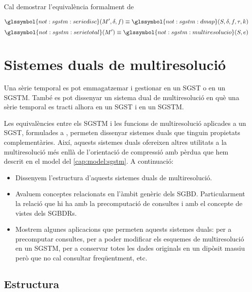 Cal demostrar l'equivalència formalment de 


\[
\glssymbol{not:sgstm:seriedisc}(M',\delta,f) \equiv
\glssymbol{not:sgstm:dmap}(S,\delta,f,\tau,k)
\]
\[
\glssymbol{not:sgstm:serietotal}(M') \equiv \glssymbol{not:sgstm:multiresolucio}(S,e)
\]












\chapter{Sistemes duals de multiresolució}
\label{sec:multiresolucio:dual}


Una sèrie temporal es pot emmagatzemar i gestionar en un \gls{SGST} o
en un \gls{SGSTM}. També es pot dissenyar un sistema dual de
multiresolució en què una sèrie temporal es tracti alhora en un \gls{SGST}
i en un \gls{SGSTM}.

Les equivalències entre els \gls{SGSTM} i les funcions de
multiresolució aplicades a un \gls{SGST}, formulades a
, permeten dissenyar sistemes duals
que tinguin propietats complementàries.  Així, aquests sistemes duals
ofereixen altres utilitats a la multiresolució més enllà de
l'orientació de compressió amb pèrdua que hem descrit en el model del
\autoref{cap:model:sgstm}. 
% 
A continuació:
\begin{itemize}
\item Dissenyem l'estructura d'aquests sistemes duals de multiresolució.
\item Avaluem conceptes relacionats en l'àmbit genèric dels
  \gls{SGBD}. Particularment la relació que hi ha amb la precomputació
  de consultes i amb el concepte de vistes dels \glspl{SGBDR}.
\item Mostrem algunes aplicacions que permeten aquests sistemes duals:
  per a precomputar consultes, per a poder modificar els esquemes de
  multiresolució en un \gls{SGSTM}, per a conservar totes les dades
  originals en un dipòsit massiu però que no cal consultar
  freqüentment, etc.
\end{itemize}





\section{Estructura}

